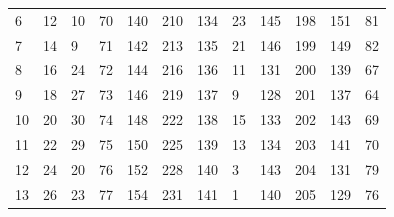 \begin{table}[]
\begin{tabular}{llllllllllll}
6                      & 12                     & 10                     & 70                     & 140                    & 210                    & 134                    & 23                     & 145                    & 198                    & 151                    & 81                     \\
7                      & 14                     & 9                      & 71                     & 142                    & 213                    & 135                    & 21                     & 146                    & 199                    & 149                    & 82                     \\
8                      & 16                     & 24                     & 72                     & 144                    & 216                    & 136                    & 11                     & 131                    & 200                    & 139                    & 67                     \\
9                      & 18                     & 27                     & 73                     & 146                    & 219                    & 137                    & 9                      & 128                    & 201                    & 137                    & 64                     \\
10                     & 20                     & 30                     & 74                     & 148                    & 222                    & 138                    & 15                     & 133                    & 202                    & 143                    & 69                     \\
11                     & 22                     & 29                     & 75                     & 150                    & 225                    & 139                    & 13                     & 134                    & 203                    & 141                    & 70                     \\
12                     & 24                     & 20                     & 76                     & 152                    & 228                    & 140                    & 3                      & 143                    & 204                    & 131                    & 79                     \\
13                     & 26                     & 23                     & 77                     & 154                    & 231                    & 141                    & 1                      & 140                    & 205                    & 129                    & 76                     \\

\end{tabular}
\end{table}
